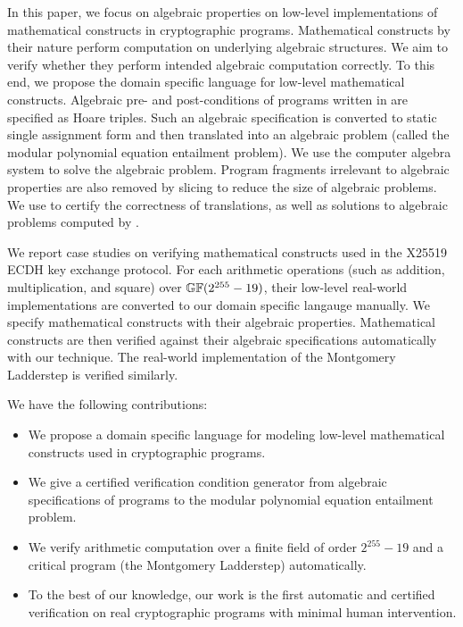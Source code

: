 In this paper, we focus on algebraic properties on low-level
implementations of mathematical constructs in cryptographic programs.
Mathematical constructs by their nature perform computation on
underlying algebraic structures. We aim to verify whether they perform
intended algebraic computation correctly. To this end, we propose the
domain specific language \mydsl for low-level 
mathematical constructs. Algebraic pre- and post-conditions of
programs written in \mydsl are specified as Hoare
triples. Such an algebraic specification is converted to static single 
assignment form and then translated into an algebraic problem (called 
the modular polynomial equation entailment problem). We use the computer
algebra system \singular to solve the algebraic problem. 
Program fragments irrelevant to algebraic properties are also
removed by slicing to reduce the size of algebraic problems.
We use \coq to certify the
correctness of translations, as well as solutions to algebraic
problems computed by \singular.

We report case studies on verifying mathematical constructs used in
the X25519 ECDH key exchange protocol. For each arithmetic operations
(such as addition, multiplication, and square) over $\mathbb{GF}(2^{255} - 19)$,
their low-level real-world implementations are converted to our domain
specific langauge \mydsl manually. We specify mathematical
constructs with their algebraic properties. Mathematical constructs
are then verified against their algebraic
specifications automatically with our technique. 
The real-world implementation of the Montgomery Ladderstep is 
verified similarly.  


We have the following contributions:
\begin{itemize}
\item We propose a domain specific language \mydsl for modeling low-level
  mathematical constructs used in cryptographic programs.
\item We give a certified verification condition generator from
  algebraic specifications of programs to the modular polynomial
  equation entailment problem.
\item We verify arithmetic computation over a finite field of order
  $2^{255} - 19$ and a
  critical program (the Montgomery Ladderstep) automatically.
\item To the best of our knowledge, our work is the first automatic
  and certified verification on real cryptographic programs with
  minimal human intervention.
\end{itemize}


